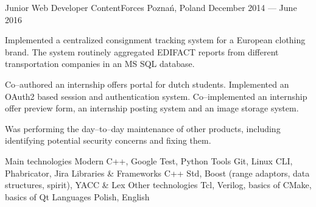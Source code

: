 \documentclass[11pt, a4paper]{awesome-cv}
\begin{document}
\begin{cventries}
  \cventry
    {Junior Web Developer} %
    {ContentForces} %
    {Poznań, Poland} %
    {December 2014 --- June 2016} %
    {
      \begin{cvitems} %
        \item {Implemented a centralized consignment tracking system for a European clothing brand. The system routinely aggregated EDIFACT reports from different transportation companies in an MS SQL database.}
        \item {Co--authored an internship offers portal for dutch students. Implemented an OAuth2 based session and authentication system. Co--implemented an internship offer preview form, an internship posting system and an image storage system.}
        \item {Was performing the day--to--day maintenance of other products, including identifying potential security concerns and fixing them.}
      \end{cvitems}
    }
\end{cventries}

\begin{cvskills}
  \cvskill
    {Main technologies} %
    {Modern C++, Google Test, Python} %
  \cvskill
    {Tools} %
    {Git, Linux CLI, Phabricator, Jira} %
  \cvskill
    {Libraries \& Frameworks} %
    {C++ Std, Boost (range adaptors, data structures, spirit), YACC \& Lex}
  \cvskill
    {Other technologies} %
    {Tcl, Verilog, basics of CMake, basics of Qt} %
  \cvskill
    {Languages} %
    {Polish, English} %
\end{cvskills}
\end{document}
